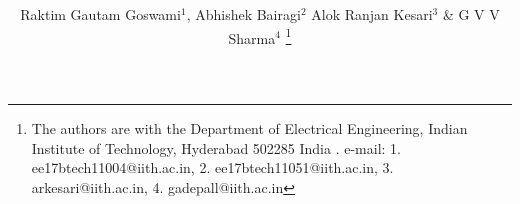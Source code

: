 \documentclass[journal,12pt,twocolumn]{IEEEtran}
\begin{document}
\def\putbox#1#2#3{\makebox[0in][l]{\makebox[#1][l]{}\raisebox{\baselineskip}[0in][0in]{\raisebox{#2}[0in][0in]{#3}}}}
     \def\rightbox#1{\makebox[0in][r]{#1}}
     \def\centbox#1{\makebox[0in]{#1}}
     \def\topbox#1{\raisebox{-\baselineskip}[0in][0in]{#1}}
     \def\midbox#1{\raisebox{-0.5\baselineskip}[0in][0in]{#1}}

\vspace{3cm}

\title{ 
}
\author{Raktim Gautam Goswami$^{1}$, Abhishek Bairagi$^{2}$ Alok Ranjan Kesari$^{3} $ \& G V V Sharma$^{4}$ 
\thanks{The authors are with the Department
of Electrical Engineering, Indian Institute of Technology, Hyderabad
502285 India .  e-mail: 1. ee17btech11004@iith.ac.in, 2. ee17btech11051@iith.ac.in, 3. arkesari@iith.ac.in, 4. gadepall@iith.ac.in}%
}


% 
%
\end{document}
